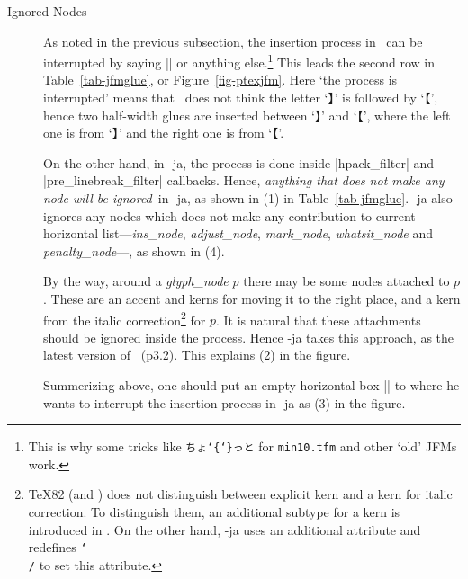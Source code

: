 \documentclass{ajt}
\begin{document}
\begin{description}
\item[Ignored Nodes]
As noted in the previous subsection, the insertion process in \pTeX\ can
	   be interrupted by saying |{}| or anything else.\footnote{This
	   is why some tricks like \texttt{ちょ\char`\{\char`\}っと} for
	   \texttt{min10.tfm} and other `old' JFMs work.} This leads the
	   second row in Table~\ref{tab-jfmglue}, or
	   Figure~\ref{fig-ptexjfm}. Here `the process is interrupted'
	   means that \pTeX\ does not think the letter `】\inhibitglue'
	   is followed by `\inhibitglue【', hence two half-width glues
	   are inserted between `】\inhibitglue' and `\inhibitglue【',
	   where the left one is from `】\inhibitglue' and the right one
	   is from `\inhibitglue【'.

	   On the other hand, in \LuaTeX-ja, the process is done inside
	   |hpack_filter| and |pre_linebreak_filter| callbacks. Hence,
	   \emph{anything that does not make any node will be
	   ignored}\ in \LuaTeX-ja, as shown in (1) in
	   Table~\ref{tab-jfmglue}. \LuaTeX-ja also ignores any nodes
	   which does not make any contribution to current horizontal
	   list---\emph{ins\_node}, \emph{adjust\_node},
	   \emph{mark\_node}, \emph{whatsit\_node} and
	   \emph{penalty\_node}---, as shown in (4).


By the way, around a \emph{glyph\_node} $p$ there may be some nodes
	   attached to $p$. These are an accent and kerns for
	   moving it to the right place, and a kern from the italic
	   correction\footnote{\TeX82 (and \LuaTeX) does not distinguish
	   between explicit kern and a kern for italic correction. To
	   distinguish them, an additional subtype for a kern is introduced
	   in \pTeX. On the other hand, \LuaTeX-ja uses an additional attribute and
	   redefines \texttt{\char`\\/} to set this attribute.} for $p$. It is natural that
	   these attachments should be ignored inside the process. Hence
	   \LuaTeX-ja takes this approach, as the latest version of
	   \pTeX\ (p3.2). This explains (2) in the figure.

Summerizing above, one should put an empty horizontal box |\hbox{}| to
	   where he wants to interrupt the insertion process in
	   \LuaTeX-ja as (3) in the figure.


\end{description}
\end{document}
